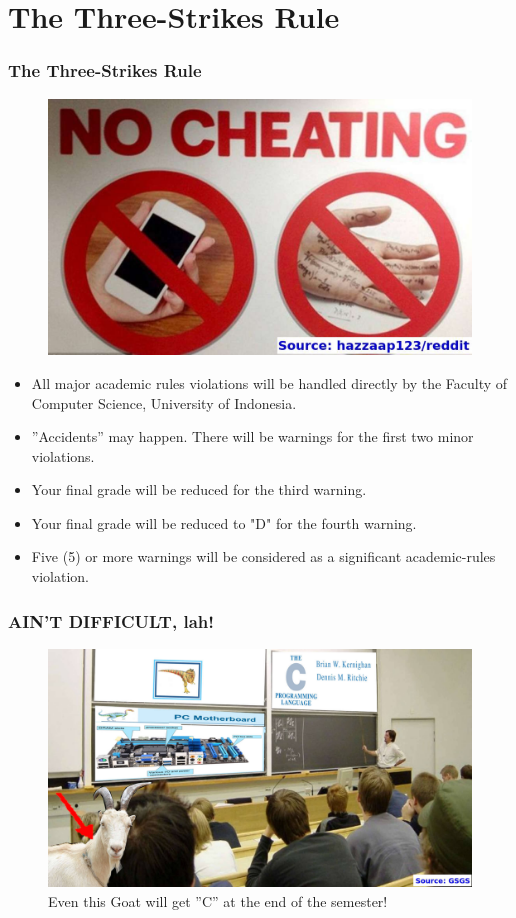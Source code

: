\documentclass[aspectratio=169, xcolor=table, notheorems, hyperref={pdfpagelabels=false}]{beamer}
\begin{document}
\section{The Three-Strikes Rule}
\begin{frame}[fragile]
\frametitle{The Three-Strikes Rule}

\begin{figure}
\includegraphics[width=0.30\linewidth]{os-cheating}
\end{figure}

\begin{itemize}
\item All major academic rules violations will be handled directly by the Faculty of Computer Science,
University of Indonesia.
\item ''Accidents'' may happen. There will be warnings for the first two minor violations.
\item Your final grade will be reduced for the third warning.
\item Your final grade will be reduced to "D" for the fourth warning.
\item Five (5) or more warnings will be considered as a significant academic-rules violation.
\end{itemize}

\end{frame}

\begin{frame}[fragile]
\frametitle{AIN'T DIFFICULT, lah!}
\begin{figure}
\includegraphics[width=0.79\linewidth]{os-kambing-kuliah-c}
\caption{Even this Goat will get ''C'' at the end of the semester!}
\end{figure}
\end{frame}
\end{document}
